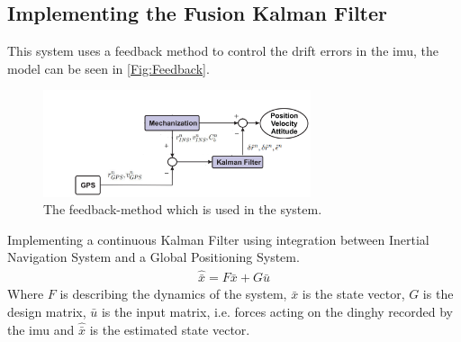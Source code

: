 \subsection{Implementing the Fusion Kalman Filter}
This system uses a feedback method to control the drift errors in the \gls{imu}, the model can be seen in \autoref{Fig:Feedback}.
\begin{figure}[H]
\centering
\includegraphics[width=0.7\textwidth]{Figures/feed-back.png}
\caption{The feedback-method which is used in the system.}
\label{Fig:Feedback}
\end{figure}
Implementing a continuous Kalman Filter using integration between Inertial Navigation System and a Global Positioning System.
\begin{align}
\hat{\bar{x}} = F \bar{x} + G \bar{u}
\label{eq.state_1}
\end{align}
Where $F$ is describing the dynamics of the system, $\bar{x}$ is the state vector, $G$ is the design matrix, $\bar{u}$ is the input matrix, i.e. forces acting on the dinghy recorded by the \gls{imu} and $\hat{\bar{x}}$ is the estimated state vector. \\

